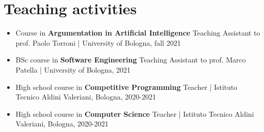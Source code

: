 \documentclass[10pt, a4paper]{extarticle}
\begin{document}
\begin{itemize}
\end{itemize}

\section*{Teaching activities}


\begin{itemize}
  \item Course in \textbf{Argumentation in Artificial Intelligence} \hfill Teaching Assistant to prof. Paolo Torroni | University of Bologna, fall 2021
  \item BSc course in \textbf{Software Engineering} \hfill Teaching Assistant to prof. Marco Patella |  University of Bologna, 2021
  \item High school course in \textbf{Competitive Programming} \hfill Teacher | Istituto Tecnico Aldini Valeriani, Bologna, 2020-2021
  \item High school course in \textbf{Computer Science} \hfill Teacher |  Istituto Tecnico Aldini Valeriani, Bologna, 2020-2021
\end{itemize}
\nocite{*}

\end{document}
